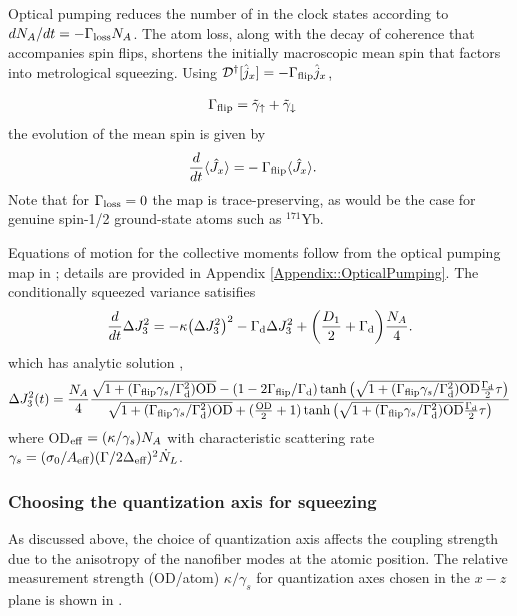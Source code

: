 \documentclass[preprint,aps,pra,onecolumn]{revtex4-1} %
\newcommand{\gammap}{\tilde{\gamma}_\uparrow + \tilde{\gamma}_\downarrow}
\newcommand{\drate}{\Gamma_{\rm d}}
\newcommand{\frate}{\Gamma_{\rm flip}}
\newcommand{\lrate}{\Gamma_{\rm loss}}
\begin{document}
Optical pumping reduces the number of in the clock states according to $dN_A/dt =  - \lrate N_A$. The atom loss, along with the decay of coherence that accompanies spin flips, shortens the initially macroscopic mean spin that factors into metrological squeezing. Using $\mathcal{D}\dg[\hat{j}_x] = - \frate \hat{j}_x $, 	
	
	\begin{align}
		\frate& =  \gammap 
	\end{align} the evolution of the mean spin is given by
 	\begin{align}
		\frac{d}{dt} \expt{\hat{J}_x} =& - \frate \expt{\hat{J}_x}.
	\end{align}
Note that for $\lrate = 0$ the map is trace-preserving, as would be the case for genuine spin-1/2 ground-state atoms such as $^{171}$Yb.  


Equations of motion for the collective moments follow from the optical pumping map in ; details are provided in Appendix \ref{Appendix::OpticalPumping}. The conditionally squeezed variance satisifies 	
	\begin{align} \label{Eq::J3variance}
		\frac{d}{dt} \Delta J_3^2 = - \kappa \big( \Delta J_3^2 \big)^2 - \drate \Delta J_3^2 + \bigg( \frac{D_1}{2} + \drate \bigg) \frac{N_A}{4} . 
	\end{align}
which has analytic solution \cite{baragiola_three-dimensional_2014},
	\begin{align}
		\Delta J_3^2(t) = \frac{N_A}{4} \frac{\sqrt{1+(\frate \gamma_s /\drate^2) \rm{OD}} - (1-2\frate/\drate) \tanh \big( \sqrt{1+(\frate \gamma_s/\drate^2) \rm{OD}} \frac{\drate}{2} \tau \big)}{ \sqrt{1+(\frate \gamma_s/\drate^2) \rm{OD}} + (\frac{\rm{OD}}{2} + 1) \tanh \big( \sqrt{1+(\frate \gamma_s /\drate^2) \rm{OD}} \frac{\drate}{2} \tau \big) }
	\end{align}
where OD$_{\rm eff} = (\kappa/\gamma_s) N_A$ with characteristic scattering rate $\gamma_s = (\sigma_0/A_{\text{eff}})(\Gamma/2 \Delta_{\text{eff}})^2 \dot{N}_L$.

\subsubsection{Choosing the quantization axis for squeezing}
As discussed above, the choice of quantization axis affects the coupling strength due to the anisotropy of the nanofiber modes at the atomic position. The relative measurement strength (OD/atom) $\kappa/\gamma_s$ for quantization axes chosen in the $x-z$ plane is shown in \frf{}.
\end{document}
